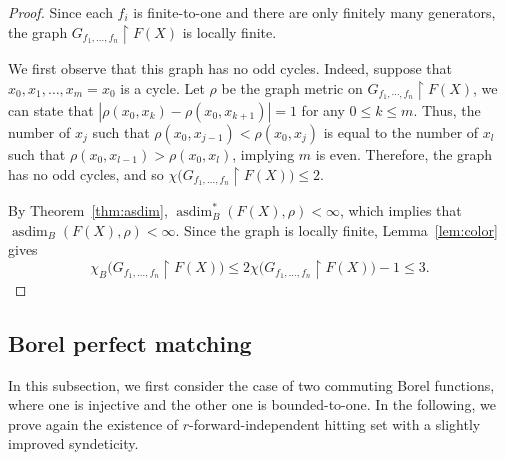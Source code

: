 \documentclass[11pt, reqno, a4paper]{amsart}
\theoremstyle{definition}
\theoremstyle{plain}
\begin{document}
\begin{proof}
Since each $f_i$ is finite-to-one and there are only finitely many generators,
the graph
$G_{f_1,\ldots,f_n}\upharpoonright F(X)$
is locally finite.

We first observe that this graph has no odd cycles. Indeed, suppose that
$x_0,x_1,\ldots,x_m=x_0$
is a cycle. Let $\rho$ be the graph metric on $G_{f_1,\cdots,f_n}\upharpoonright F(X)$, we can state that $|\rho(x_0,x_k)-\rho(x_0,x_{k+1})|=1$ for any $0\le k\le m$. Thus, the number of $x_j$ such that $\rho(x_0,x_{j-1})<\rho(x_0,x_j)$ is equal to the number of $x_l$ such that $\rho(x_0,x_{l-1})>\rho(x_0,x_l)$, implying $m$ is even.
Therefore, the graph has no odd cycles, and so
$\chi\bigl(G_{f_1,\ldots,f_n}\upharpoonright F(X)\bigr)\le 2$.

By Theorem~\ref{thm:asdim},
$\operatorname{asdim}^*_B(F(X),\rho)<\infty$, which implies that $\operatorname{asdim}_B(F(X), \rho)<\infty$.
Since the graph is locally finite, Lemma~\ref{lem:color} gives
$$
\chi_B\bigl(G_{f_1,\ldots,f_n}\upharpoonright F(X)\bigr)
\le
2\chi\bigl(G_{f_1,\ldots,f_n}\upharpoonright F(X)\bigr)-1
\le 3.
$$
\end{proof}

\subsection{Borel perfect matching}
In this subsection, we first consider the case of two commuting Borel functions, where one is injective and the other one is bounded-to-one. In the following, we prove again the existence of $r$-forward-independent hitting set with a slightly improved syndeticity.
\end{document}
